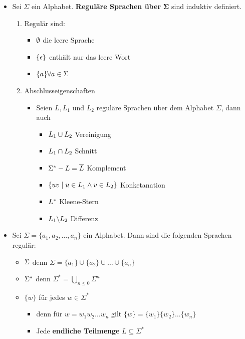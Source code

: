 \documentclass{scrartcl}
\begin{document}
\begin{itemize}
	\item Sei $\Sigma$ ein Alphabet. \textbf{Reguläre Sprachen über} $\mathbf{\Sigma}$ sind induktiv definiert.
	\begin{enumerate}
		\item Regulär sind:
		\begin{itemize}
			\item $\emptyset \hfill$ die leere Sprache
			\item $\{ \epsilon \} \hfill$ enthält nur das leere Wort
			\item $\{ a \} \hfill \forall a \in \Sigma$
		\end{itemize}
		\item Abschlusseigenschaften
		\begin{itemize}
			\item Seien $L, L_1$ und $L_2$ reguläre Sprachen über dem Alphabet $\Sigma$, dann auch
			\begin{itemize}
				\item $L_1 \cup L_2 \hfill$ Vereinigung
				\item $L_1 \cap L_2 \hfill$ Schnitt
				\item $\Sigma^* - L = \overline{L} \hfill$ Komplement
				\item $\{ uv \mid u \in L_1 \wedge v \in L_2 \} \hfill$ Konketanation
				\item $L^* \hfill$ Kleene-Stern
				\item $L_1 \backslash L_2 \hfill$ Differenz
			\end{itemize}
		\end{itemize}
	\end{enumerate}
	\item Sei $\Sigma = \{ a_1, a_2, \ldots, a_n \}$ ein Alphabet. Dann sind die folgenden Sprachen regulär:
	\begin{itemize}
		\item $\Sigma \hfill$ denn $\Sigma = \{ a_1 \} \cup \{ a_2 \} \cup \ldots \cup \{ a_n \}$
		\item $\Sigma^* \hfill$ denn $\Sigma^* = \bigcup_{n \leq 0} \Sigma^n$
		\item $\{ w \}$ für jedes $w \in \Sigma^*$
		\begin{itemize}
			\item denn für $w = w_1w_2 \ldots w_n$ gilt $\{ w \} = \{ w_1 \} \{ w_2 \} \ldots \{ w_n \}$
			\item Jede \textbf{endliche Teilmenge} $L \subseteq \Sigma^*$
		\end{itemize}

\end{itemize}
\end{itemize}
\end{document}
